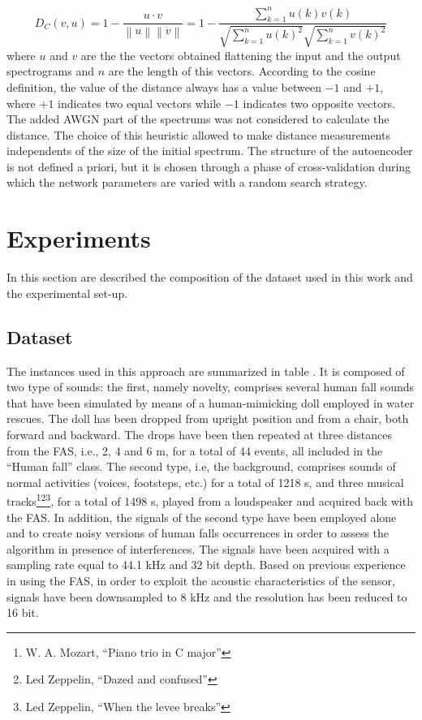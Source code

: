 \begin{equation}
D_C(v,u)=1-\frac{u\cdot v}{\left\|u \right\|\left\|v \right\| }= 1- \frac{\sum_{k=1}^{n}u(k)v(k)}{\sqrt{\sum_{k=1}^{n}u(k)^2}\sqrt{\sum_{k=1}^{n}v(k)^2}}
\end{equation}
where $u$ and $v$ are the the vectors obtained flattening the input and the output spectrograms and $n$ are the length of this vectors. 
According to the cosine definition, the value of the distance always has a value between $-1$ and $+1$, where $+1$ indicates two equal vectors while $-1$ indicates two opposite vectors.
The added AWGN part of the spectrums was not considered to calculate the distance. The choice of this heuristic allowed to make distance measurements independents of the size of the initial spectrum.
The structure of the autoencoder is not defined a priori, but it is chosen through a phase of cross-validation during which the network parameters are varied with a random search strategy.

\section{Experiments}
\label{sec:endtoend_experiments}
In this section are described the composition of the dataset used in this work and the experimental set-up.

\subsection{Dataset} 

The instances used in this approach are summarized in table .
It is composed of two type of sounds: the first, namely novelty, comprises several human fall sounds that have been simulated by means of a human-mimicking doll employed in water rescues. The doll has been dropped from upright position and from a chair, both forward and backward. The drops have been then repeated at three distances from the FAS, i.e., 2, 4 and 6 m, for a total of 44 events, all included in the “Human fall” class. The second type, i.e, the background, comprises sounds of normal activities (voices, footsteps, etc.) for a total of 1218 s, and three musical tracks\footnote{W. A. Mozart, ``Piano trio in C major''}\footnote{Led Zeppelin, ``Dazed and confused''}\footnote{Led Zeppelin, ``When the levee breaks''}, for a total of 1498 s, played from a loudspeaker and acquired back with the FAS.
In addition, the signals of the second type have been employed alone and to create noisy versions of human falls occurrences in order to assess the algorithm in presence of interferences.
The signals have been acquired with a sampling rate equal to 44.1 kHz and 32 bit depth. Based on previous experience in using the FAS, in order to exploit the acoustic characteristics of the sensor, signals have been downsampled to 8 kHz and the resolution has been reduced to 16 bit.


